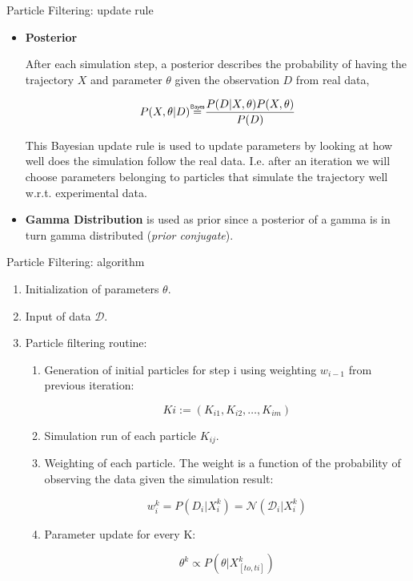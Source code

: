 \documentclass[pdf]
{beamer}
\newcommand\bayeseq{\mathrel{\overset{\makebox[0pt]{\mbox{\normalfont\tiny\sffamily Bayes}}}{=}}}
\begin{document}
\begin{frame}{Particle Filtering: update rule}

	\begin{itemize}
	\item \textbf{Posterior}
	
	After each simulation step, a posterior describes the probability of having the trajectory $X$ and
parameter $\theta$ given the observation $D$ from real data,

	\begin{equation}
	P (X, \theta |D) \bayeseq \frac{P(D|X, \theta) P(X, \theta)}{P(D)}
	\end{equation}
	
	This Bayesian update rule is used to update parameters by looking at how well does the simulation follow the real data. I.e. after an iteration we will choose parameters belonging to particles that simulate the trajectory well w.r.t. experimental data.
	
	\item \textbf{Gamma Distribution} is used as prior since a posterior of a gamma is in turn gamma distributed (\textit{prior conjugate}).
	\end{itemize}
	
\end{frame}

\begin{frame}{Particle Filtering: algorithm}
	\begin{enumerate}
		\item Initialization of parameters $\theta$.
		\item Input of data $\mathcal{D}$.
		\item Particle filtering routine:

		\begin{enumerate}
			\item Generation of initial particles for step i using weighting $w_{i-1}$ from previous iteration:
			
			\begin{equation}
				Ki := (K_{i1}, K_{i2}, \dots, K_{im})
			\end{equation}

			\item Simulation run of each particle $K_{ij}$.
			\item Weighting of each particle. The weight is a function of the probability of observing the data given the simulation result:

			\begin{equation}
				w_i^k = P(D_i | X_i^k) = \mathcal{N}(\mathcal{D}_i | X_i^k)
			\end{equation}

			\item Parameter update for every K:

			\begin{equation}
				\theta^k \propto P(\theta | X^k_{[to, ti]})
			\end{equation}

		\end{enumerate}

	\end{enumerate}
\end{frame}
\end{document}
